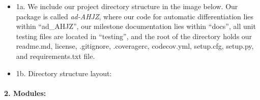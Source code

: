 \documentclass[11pt]{article}
\begin{document}
\begin{itemize}
\item
  1a. We include our project directory structure in the image below. Our
  package is called \emph{ad-AHJZ}, where our code for automatic
  differentiation lies within ``ad\_AHJZ'', our milestone documentation
  lies within ``docs'', all unit testing files are located in
  ``testing'', and the root of the directory holds our readme.md,
  license, .gitignore, .coveragerc, codecov.yml, setup.cfg, setup.py,
  and requirements.txt file.
\item
  1b. Directory structure layout:
\end{itemize}

\hypertarget{modules}{%
\paragraph{\texorpdfstring{2.
\textbf{Modules:}}{2. Modules:}}\label{modules}}
\end{document}
